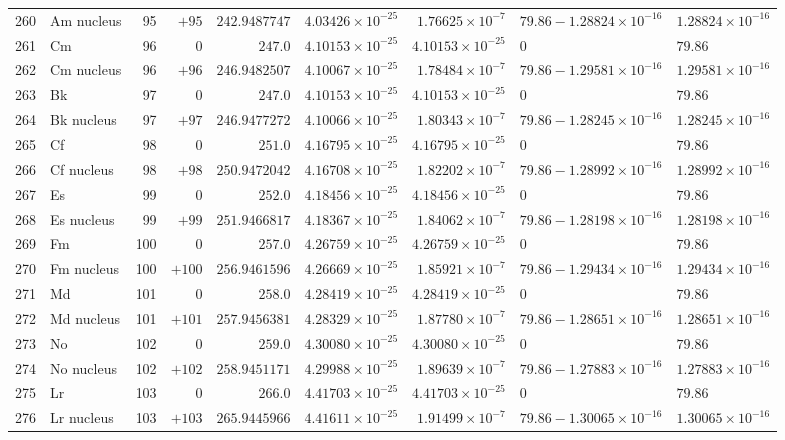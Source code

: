 {\begin{tabular}{@{}r l r r r r r l l@{}}
260 & Am nucleus & 95 & $+95$ & $242.9487747$ & $4.03426{\times}10^{-25}$ & $1.76625{\times}10^{-7}$ & $79.86 - 1.28824{\times}10^{-16}$ & $1.28824{\times}10^{-16}$ \\
261 & Cm & 96 & $0$ & $247.0$ & $4.10153{\times}10^{-25}$ & $4.10153{\times}10^{-25}$ & $0$ & $79.86$ \\
262 & Cm nucleus & 96 & $+96$ & $246.9482507$ & $4.10067{\times}10^{-25}$ & $1.78484{\times}10^{-7}$ & $79.86 - 1.29581{\times}10^{-16}$ & $1.29581{\times}10^{-16}$ \\
263 & Bk & 97 & $0$ & $247.0$ & $4.10153{\times}10^{-25}$ & $4.10153{\times}10^{-25}$ & $0$ & $79.86$ \\
264 & Bk nucleus & 97 & $+97$ & $246.9477272$ & $4.10066{\times}10^{-25}$ & $1.80343{\times}10^{-7}$ & $79.86 - 1.28245{\times}10^{-16}$ & $1.28245{\times}10^{-16}$ \\
265 & Cf & 98 & $0$ & $251.0$ & $4.16795{\times}10^{-25}$ & $4.16795{\times}10^{-25}$ & $0$ & $79.86$ \\
266 & Cf nucleus & 98 & $+98$ & $250.9472042$ & $4.16708{\times}10^{-25}$ & $1.82202{\times}10^{-7}$ & $79.86 - 1.28992{\times}10^{-16}$ & $1.28992{\times}10^{-16}$ \\
267 & Es & 99 & $0$ & $252.0$ & $4.18456{\times}10^{-25}$ & $4.18456{\times}10^{-25}$ & $0$ & $79.86$ \\
268 & Es nucleus & 99 & $+99$ & $251.9466817$ & $4.18367{\times}10^{-25}$ & $1.84062{\times}10^{-7}$ & $79.86 - 1.28198{\times}10^{-16}$ & $1.28198{\times}10^{-16}$ \\
269 & Fm & 100 & $0$ & $257.0$ & $4.26759{\times}10^{-25}$ & $4.26759{\times}10^{-25}$ & $0$ & $79.86$ \\
270 & Fm nucleus & 100 & $+100$ & $256.9461596$ & $4.26669{\times}10^{-25}$ & $1.85921{\times}10^{-7}$ & $79.86 - 1.29434{\times}10^{-16}$ & $1.29434{\times}10^{-16}$ \\
271 & Md & 101 & $0$ & $258.0$ & $4.28419{\times}10^{-25}$ & $4.28419{\times}10^{-25}$ & $0$ & $79.86$ \\
272 & Md nucleus & 101 & $+101$ & $257.9456381$ & $4.28329{\times}10^{-25}$ & $1.87780{\times}10^{-7}$ & $79.86 - 1.28651{\times}10^{-16}$ & $1.28651{\times}10^{-16}$ \\
273 & No & 102 & $0$ & $259.0$ & $4.30080{\times}10^{-25}$ & $4.30080{\times}10^{-25}$ & $0$ & $79.86$ \\
274 & No nucleus & 102 & $+102$ & $258.9451171$ & $4.29988{\times}10^{-25}$ & $1.89639{\times}10^{-7}$ & $79.86 - 1.27883{\times}10^{-16}$ & $1.27883{\times}10^{-16}$ \\
275 & Lr & 103 & $0$ & $266.0$ & $4.41703{\times}10^{-25}$ & $4.41703{\times}10^{-25}$ & $0$ & $79.86$ \\
276 & Lr nucleus & 103 & $+103$ & $265.9445966$ & $4.41611{\times}10^{-25}$ & $1.91499{\times}10^{-7}$ & $79.86 - 1.30065{\times}10^{-16}$ & $1.30065{\times}10^{-16}$ \\
\bottomrule
\end{tabular}}
